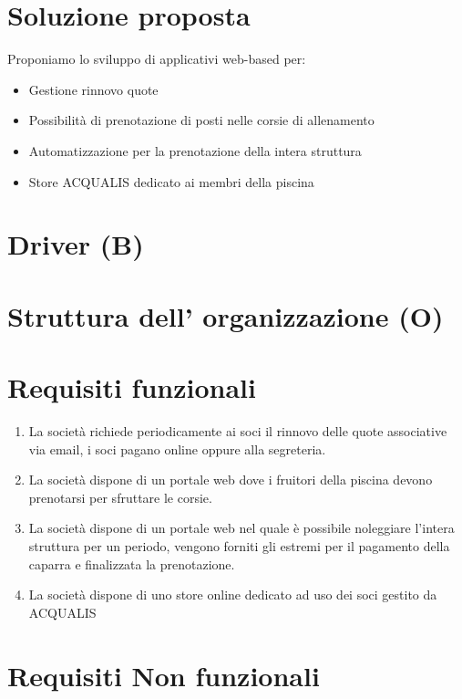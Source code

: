 \documentclass[11pt]{article} %
\begin{document}
\section{Soluzione proposta}

Proponiamo lo sviluppo di applicativi web-based per:

\begin{itemize}
	\item Gestione rinnovo quote
	\item Possibilità di prenotazione di posti nelle corsie di allenamento
	\item Automatizzazione per la prenotazione della intera struttura
	\item Store ACQUALIS dedicato ai membri della piscina
\end{itemize}

\section{Driver (B)}

\section{Struttura dell' organizzazione (O)}

\section{Requisiti funzionali}

\begin{enumerate}
	\item La società richiede periodicamente ai soci il rinnovo delle quote associative via email, i soci pagano online oppure alla segreteria.
	\item La società dispone di un portale web dove i fruitori della piscina devono prenotarsi per sfruttare le corsie.
	\item La società dispone di un portale web nel quale è possibile noleggiare l'intera struttura per un periodo, vengono forniti gli estremi per il pagamento della caparra e finalizzata la prenotazione.
	\item La società dispone di uno store online dedicato ad uso dei soci gestito da ACQUALIS
\end{enumerate}



\section{Requisiti Non funzionali}
\end{document}
